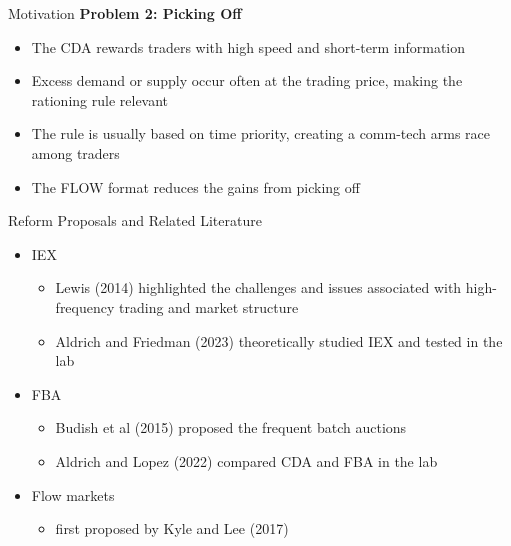 \documentclass[10pt]{beamer}
\begin{document}
\begin{frame}{Motivation}
    \textbf{Problem 2: Picking Off} 
    \begin{itemize}
        \item The CDA rewards traders with high speed and short-term information 
        \item Excess demand or supply occur often at the trading price, making the rationing rule relevant 
        \item The rule is usually based on time priority, creating a comm-tech arms race among traders %
        \item The FLOW format reduces the gains from picking off 
    \end{itemize}
\end{frame}

\begin{frame}{Reform Proposals and Related Literature}
    \begin{itemize}
        \item IEX
            \begin{itemize}
                \item Lewis (2014) highlighted the challenges and issues associated with high-frequency trading and market structure 
                \item Aldrich and Friedman (2023) theoretically studied IEX and tested in the lab 
            \end{itemize}
        \item FBA 
            \begin{itemize}
                \item Budish et al (2015) proposed the frequent batch auctions
                \item Aldrich and Lopez (2022) compared CDA and FBA in the lab
            \end{itemize}
        \item Flow markets
            \begin{itemize}
                \item first proposed by Kyle and Lee (2017)
            \end{itemize}
    \end{itemize}
\end{frame}
\end{document}
